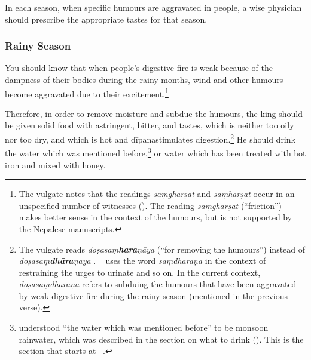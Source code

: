 \begin{translation}
\item [4] 
In each season, when specific humours are aggravated in people, a wise physician should prescribe the appropriate tastes for that season.

\subsubsection{Rainy Season}
\item [5] %
You should know that when people's digestive fire is weak because of the dampness of their bodies during the rainy months, wind and other humours become aggravated due to their excitement.\footnote{%
    The vulgate notes that the readings \emph{saṃgharṣāt} and \emph{saṃharṣāt} occur in an unspecified number of witnesses (\cite[809, n.\,2]{vulgate}). The reading \emph{saṃgharṣāt} (``friction'') makes better sense in the context of the humours, but is not supported by the Nepalese manuscripts.}

\item [6--8ab] 
Therefore, in order to remove moisture and subdue the humours,
the king should be given solid food with astringent, bitter, and  tastes, which is neither too oily nor too dry, and which is hot and \se
{dīpana}{stimulates digestion}.\footnote{%
        The vulgate reads \emph{doṣasaṃ\textbf{hara}ṇāya} (``for removing the humours'') instead of \emph{doṣasaṃ\textbf{dhāra}ṇāya} \citep[809]{vulgate}. \CS\  uses the word \emph{saṃdhāraṇa} in the context of restraining the urges to urinate and so on. In the current context, \emph{doṣasaṃdhāraṇa} refers to subduing the humours that have been aggravated by weak digestive fire during the rainy season (mentioned in the previous verse).}  
He should drink the water which was mentioned before,\footnote{%
         understood “the water which was mentioned before” to be monsoon rainwater, which was described in the section on what to drink (). This is the section that starts at \SS\ .} %
or water which has been treated with hot iron %
and mixed with honey.%
%

% 


\end{translation}
